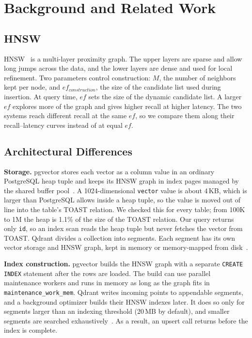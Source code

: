 \documentclass[sigconf, nonacm]{acmart}
\begin{document}
\section{Background and Related Work}

\subsection{HNSW}

HNSW~\cite{malkov2018} is a multi-layer proximity graph. The upper layers are sparse
and allow long jumps across the data, and the lower layers are dense and used for local
refinement. Two parameters control construction: $M$, the number of neighbors kept per
node, and $ef_{construction}$, the size of the candidate list used during insertion.
At query time, $ef$ sets the size of the dynamic candidate list. A larger $ef$ explores
more of the graph and gives higher recall at higher latency. The two systems reach
different recall at the same $ef$, so we compare them along their recall--latency curves
instead of at equal $ef$.

\subsection{Architectural Differences}

\textbf{Storage.} pgvector stores each vector as a column value in an ordinary
PostgreSQL heap tuple and keeps its HNSW graph in index pages managed by the shared
buffer pool~\cite{pgvector,postgres_docs}. A 1024-dimensional \texttt{vector} value is
about 4\,KB, which is larger than PostgreSQL allows inside a heap tuple, so the value is
moved out of line into the table's TOAST relation. We checked this for every table; from
100K to 1M the heap is 1.1\% of the size of the TOAST relation. Our query returns only
\texttt{id}, so an index scan reads the heap tuple but never fetches the vector from
TOAST. Qdrant divides a collection into segments. Each segment has its own vector
storage and HNSW graph, kept in memory or memory-mapped from disk~\cite{qdrant}.

\textbf{Index construction.} pgvector builds the HNSW graph with a separate
\texttt{CREATE INDEX} statement after the rows are loaded. The build can use parallel
maintenance workers and runs in memory as long as the graph fits in
\texttt{maintenance\_work\_mem}. Qdrant writes incoming points to appendable segments,
and a background optimizer builds their HNSW indexes later. It does so only for
segments larger than an indexing threshold (20\,MB by default), and smaller segments
are searched exhaustively~\cite{qdrant}. As a result, an upsert call returns before the
index is complete.
\end{document}
